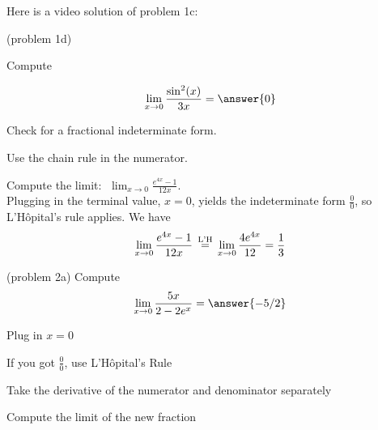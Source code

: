 \documentclass[handout]{ximera}
\begin{document}
Here is a video solution of  problem 1c:
\begin{foldable}
\end{foldable}

\begin{problem}(problem 1d)

Compute

        \[  \lim_{x \to 0} \frac{\sin^2(x)}{3x} = \answer{0} \]
  
   \begin{hint}   Check for a fractional indeterminate form.  \end{hint}
    
   \begin{hint}   Use the chain rule in the numerator.        \end{hint}
		
\end{problem}



\begin{example}[example 2]
 Compute the limit:  $\displaystyle{\;\lim_{x \to 0} \frac{e^{4x} - 1}{12x}}.$\\
Plugging in the terminal value, $x=0$, yields 
the indeterminate form $\frac00$, so L'H\^{o}pital's rule applies.
We have 
\[
\lim_{x \to 0} \frac{e^{4x} - 1}{12x} \,\overset{\scriptsize\text{L'H}}{=}\, \lim_{x \to 0} \frac{4e^{4x}}{12} = \frac13
\]
\end{example}


\begin{problem}(problem 2a)
  Compute
  \[
  \lim_{x \to 0} \frac{5x}{2 - 2e^x} = \answer{-5/2}
  \]
  
    \begin{hint}
      Plug in $x=0$
    \end{hint}
    \begin{hint}
      If you got $\frac00$, use L'H\^{o}pital's Rule
    \end{hint}
    \begin{hint}
      Take the derivative of the numerator and denominator separately
    \end{hint}
	  \begin{hint}
      Compute the limit of the new fraction
    \end{hint}
	
\end{problem}
\end{document}
